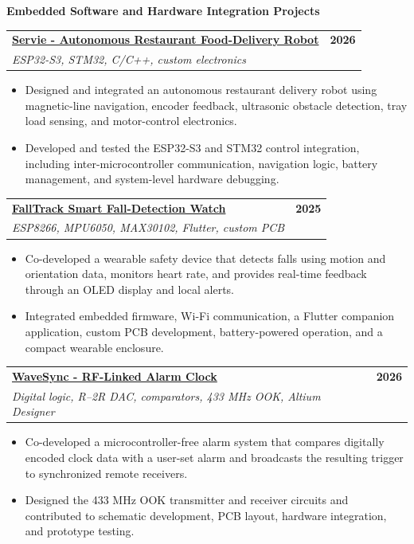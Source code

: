 \documentclass[a4paper,10pt]{article}
\makeatletter
\newcommand{\projectEntry}[3]{%
  \Needspace{9\baselineskip}%
  \begin{tabularx}{\textwidth}{@{}Xr@{}}
    \textbf{#1} & \textbf{\small #3} \\
    {\small\textit{#2}} &
  \end{tabularx}
  \vspace{0.35mm}
}
\newcommand{\projectCategory}[1]{%
  \vspace{1.0mm}
  {\normalsize\bfseries\color{accent} #1}\par
  \vspace{0.75mm}
}
\makeatother
\begin{document}
\projectCategory{Embedded Software and Hardware Integration Projects}

\projectEntry
  {\href{https://github.com/hakammra/Restaurent-Robot}{Servie - Autonomous Restaurant Food-Delivery Robot \faGithub}}
  {ESP32-S3, STM32, C/C++, custom electronics}
  {2026}
\begin{itemize}
  \item Designed and integrated an autonomous restaurant delivery robot using magnetic-line navigation, encoder feedback, ultrasonic obstacle detection, tray load sensing, and motor-control electronics.
  \item Developed and tested the ESP32-S3 and STM32 control integration, including inter-microcontroller communication, navigation logic, battery management, and system-level hardware debugging.
\end{itemize}
\vspace{1.35mm}

\projectEntry
  {\href{https://github.com/hakammra/falltrack-watch}{FallTrack Smart Fall-Detection Watch \faGithub}}
  {ESP8266, MPU6050, MAX30102, Flutter, custom PCB}
  {2025}
\begin{itemize}
  \item Co-developed a wearable safety device that detects falls using motion and orientation data, monitors heart rate, and provides real-time feedback through an OLED display and local alerts.
  \item Integrated embedded firmware, Wi-Fi communication, a Flutter companion application, custom PCB development, battery-powered operation, and a compact wearable enclosure.
\end{itemize}
\vspace{1.35mm}

\projectEntry
  {\href{https://github.com/hakammra/wavesync-rf-alarm}  {WaveSync - RF-Linked Alarm Clock \faGithub}}
  {Digital logic, R--2R DAC, comparators, 433 MHz OOK, Altium Designer}
  {2026}
\begin{itemize}
  \item Co-developed a microcontroller-free alarm system that compares digitally encoded clock data with a user-set alarm and broadcasts the resulting trigger to synchronized remote receivers.
  \item Designed the 433 MHz OOK transmitter and receiver circuits and contributed to schematic development, PCB layout, hardware integration, and prototype testing.
\end{itemize}
\vspace{1.35mm}
\end{document}
